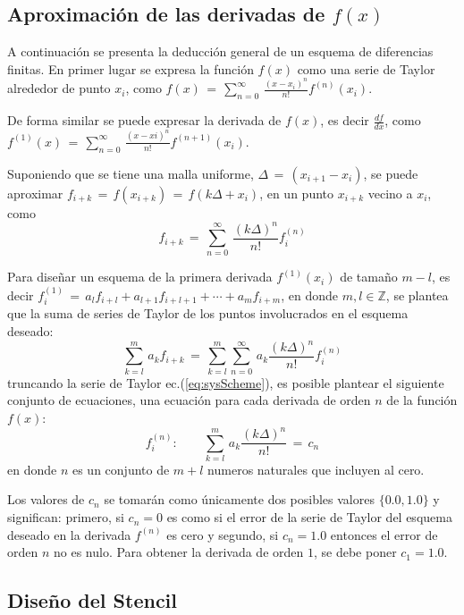 \documentclass[9pt,technote,twoside,letterpaper,onecolumn]{IEEEtran}
\begin{document}
\begin{multicols}{2}
\subsection{Aproximación de las derivadas de $f(x)$}
\label{sec:aproxDFM}

A continuación se presenta la deducción general de un esquema de diferencias finitas. En primer lugar se expresa la función $f(x)$ como una serie de Taylor alrededor de punto $x_i$, como $f(x)\,=\,\sum^\infty_{n=0}\,\frac{(x-x_i)^n}{n!}f^{(n)}(x_i)$. 

De forma similar se puede expresar la derivada de $f(x)$, es decir $\frac{df}{dx}$, como $f^{(1)}(x)\,=\,\sum^\infty_{n=0}\,\frac{(x-xi)^n}{n!}f^{(n+1)}(x_i)$.

Suponiendo que se tiene una malla uniforme, $\Delta\,=\,(x_{i+1}-x_i)$, se puede aproximar $f_{i+k}\,=\,f(x_{i+k})\,=\,f(k\Delta+x_i)$, en un punto $x_{i+k}$ vecino a $x_i$, como
\begin{equation}
  f_{i+k}\,=\,\sum^\infty_{n=0}\,\frac{(k\Delta)^n}{n!}f^{(n)}_i
  \label{eq:xi+k}
\end{equation}

Para diseñar un esquema de la primera derivada $f^{(1)}(x_i)$ de tamaño $m-l$, es decir $f^{(1)}_i\,=\,a_lf_{i+l}+a_{l+1}f_{i+l+1}+\cdots+a_mf_{i+m}$, en donde $m,l\in\mathbb{Z}$, se plantea que la suma de series de Taylor de los puntos involucrados en el esquema deseado:
\begin{equation}
  \sum^m_{k=l}\,a_kf_{i+k}\,=\,\sum^m_{k=l}\sum^\infty_{n=0}\,a_k\frac{(k\Delta)^n}{n!}f^{(n)}_i
  \label{eq:sysScheme}
\end{equation}
truncando la serie de Taylor ec.(\ref{eq:sysScheme}), es posible plantear el siguiente conjunto de ecuaciones, una ecuación para cada derivada de orden $n$ de la función $f(x)$:
\begin{equation}
  f^{(n)}_{i}:\qquad \sum^m_{k=l}\,a_k\frac{(k\Delta)^n}{n!}\,=\,c_n
  \label{eq:sysSet}
\end{equation}
en donde $n$ es un conjunto de $m+l$ numeros naturales que incluyen al cero. 

Los valores de $c_n$ se tomarán como únicamente dos posibles valores $\{0.0,1.0\}$ y significan: primero, si $c_n=0$ es como si el error de la serie de Taylor del esquema deseado en la derivada $f^{(n)}$ es cero y segundo, si $c_n=1.0$ entonces el error de orden $n$ no es nulo. Para obtener la derivada de orden $1$, se debe poner $c_1=1.0$.  

\subsection{Diseño del Stencil}
\label{sec:design}


\end{multicols}
\end{document}
